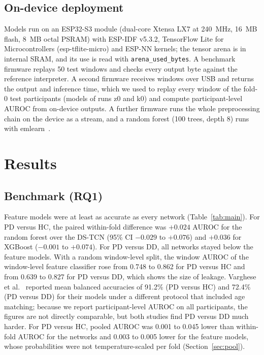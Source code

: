 \documentclass[preprint,12pt]{elsarticle}
\begin{document}
\subsection{On-device deployment}
\label{sec:device}
Models run on an ESP32-S3 module (dual-core Xtensa LX7 at 240~MHz, 16~MB flash, 8~MB octal PSRAM) with ESP-IDF v5.3.2, TensorFlow Lite for Microcontrollers (esp-tflite-micro) and ESP-NN kernels; the tensor arena is in internal SRAM, and its use is read with \texttt{arena\_used\_bytes}. A benchmark firmware replays 50 test windows and checks every output byte against the reference interpreter. A second firmware receives windows over USB and returns the output and inference time, which we used to replay every window of the fold-0 test participants (models of runs z0 and k0) and compute participant-level AUROC from on-device outputs. A further firmware runs the whole preprocessing chain on the device as a stream, and a random forest (100 trees, depth 8) runs with emlearn~\cite{emlearn}.

\section{Results}
\label{sec:results}
\subsection{Benchmark (RQ1)}
Feature models were at least as accurate as every network (Table~\ref{tab:main}). For PD versus HC, the paired within-fold difference was $+0.024$ AUROC for the random forest over the DS-TCN (95\% CI $-0.029$ to $+0.076$) and $+0.036$ for XGBoost ($-0.001$ to $+0.074$). For PD versus DD, all networks stayed below the feature models. With a random window-level split, the window AUROC of the window-level feature classifier rose from 0.748 to 0.862 for PD versus HC and from 0.639 to 0.827 for PD versus DD, which shows the size of leakage. Varghese et al.~\cite{Varghese2024} reported mean balanced accuracies of 91.2\% (PD versus HC) and 72.4\% (PD versus DD) for their models under a different protocol that included age matching; because we report participant-level AUROC on all participants, the figures are not directly comparable, but both studies find PD versus DD much harder. For PD versus HC, pooled AUROC was 0.001 to 0.045 lower than within-fold AUROC for the networks and 0.003 to 0.005 lower for the feature models, whose probabilities were not temperature-scaled per fold (Section~\ref{sec:pool}).
\end{document}
